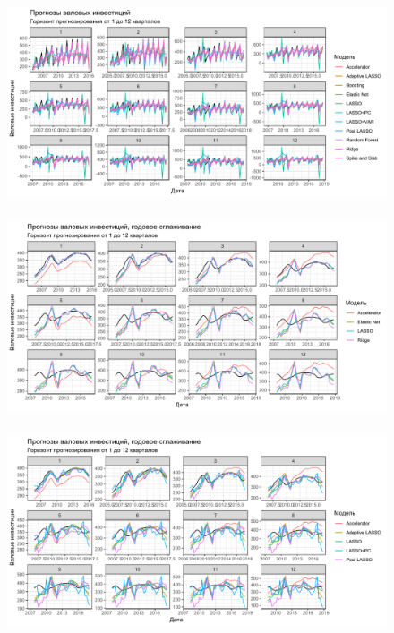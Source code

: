\documentclass[c, dvipsnames]{beamer}  %
\begin{document}
\begin{frame}
\frametitle{\insertsection} 
\framesubtitle{\insertsubsection}
\begin{figure}
\includegraphics[width=\linewidth]{bad_outall.pdf}
\end{figure}
\end{frame} 
 
 
 \begin{frame}
\frametitle{\insertsection} 
\framesubtitle{\insertsubsection}
\begin{figure}
\includegraphics[width=\linewidth]{smooth1.pdf}
\end{figure}
\end{frame} 


 \begin{frame}
\frametitle{\insertsection} 
\framesubtitle{\insertsubsection} 
\begin{figure}
\includegraphics[width=\linewidth]{smooth2.pdf}
\end{figure}
\end{frame} 
\end{document}
